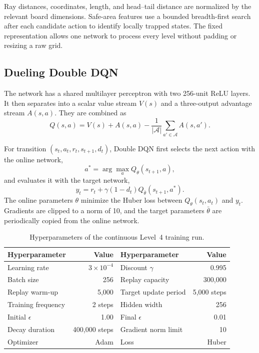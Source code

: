 \documentclass[journal]{IEEEtran}
\begin{document}
Ray distances, coordinates, length, and head--tail distance are normalized by
the relevant board dimensions. Safe-area features use a bounded breadth-first
search after each candidate action to identify locally trapped states. The
fixed representation allows one network to process every level without padding
or resizing a raw grid.

\subsection{Dueling Double DQN}

The network has a shared multilayer perceptron with two 256-unit ReLU layers.
It then separates into a scalar value stream $V(s)$ and a three-output advantage
stream $A(s,a)$. They are combined as
\begin{equation}
  Q(s,a)=V(s)+A(s,a)-\frac{1}{|\mathcal{A}|}
  \sum_{a'\in\mathcal{A}}A(s,a').
  \label{eq:dueling}
\end{equation}

For transition $(s_t,a_t,r_t,s_{t+1},d_t)$, Double DQN first selects the next
action with the online network,
\begin{equation}
  a^*=\arg\max_a Q_{\theta}(s_{t+1},a),
\end{equation}
and evaluates it with the target network,
\begin{equation}
  y_t=r_t+\gamma(1-d_t)Q_{\bar{\theta}}(s_{t+1},a^*).
  \label{eq:double-target}
\end{equation}
The online parameters $\theta$ minimize the Huber loss between
$Q_{\theta}(s_t,a_t)$ and $y_t$. Gradients are clipped to a norm of 10, and the
target parameters $\bar{\theta}$ are periodically copied from the online
network.

\begin{table}[t]
  \centering
  \caption{Hyperparameters of the continuous Level~4 training run.}
  \label{tab:hyperparameters}
  \begin{tabular}{lr@{\qquad}lr}
    \toprule
    Hyperparameter & Value & Hyperparameter & Value \\
    \midrule
    Learning rate & $3\times10^{-4}$ & Discount $\gamma$ & 0.995 \\
    Batch size & 256 & Replay capacity & 300,000 \\
    Replay warm-up & 5,000 & Target update period & 5,000 steps \\
    Training frequency & 2 steps & Hidden width & 256 \\
    Initial $\epsilon$ & 1.00 & Final $\epsilon$ & 0.01 \\
    Decay duration & 400,000 steps & Gradient norm limit & 10 \\
    Optimizer & Adam & Loss & Huber \\
    \bottomrule
  \end{tabular}
\end{table}
\end{document}
